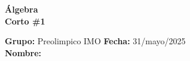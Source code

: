 \begin{center} \textbf
{
    \Large Álgebra \\ \vspace{2mm}Corto \#1
}
\end{center}
\textbf{Grupo:} Preolimpico IMO \hfill \textbf{Fecha:} 31/mayo/2025\\

\vspace{8mm}
\textbf{Nombre:} \hrulefill\\
\vspace{-8mm}
\thispagestyle{first-page-style}
